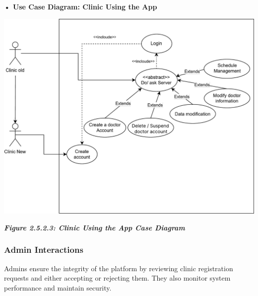 \documentclass[12pt]{report}
\begin{document}
\vspace{0.5cm}
\noindent \textbf{• Use Case Diagram: Clinic Using the App}
\vspace{0.6cm}
\begin{center}
	\includegraphics[width=\textwidth]{images/clinicCAS.pdf} %
\end{center}
\vspace{-0.35cm}
\begin{center}
	\textit{\textbf{Figure 2.5.2.3: Clinic Using the App Case Diagram}}
\end{center}

\newpage
\subsubsection{\textbf{Admin Interactions}}
Admins ensure the integrity of the platform by reviewing clinic registration requests and either accepting or rejecting them. They also monitor system performance and maintain security.
\end{document}
